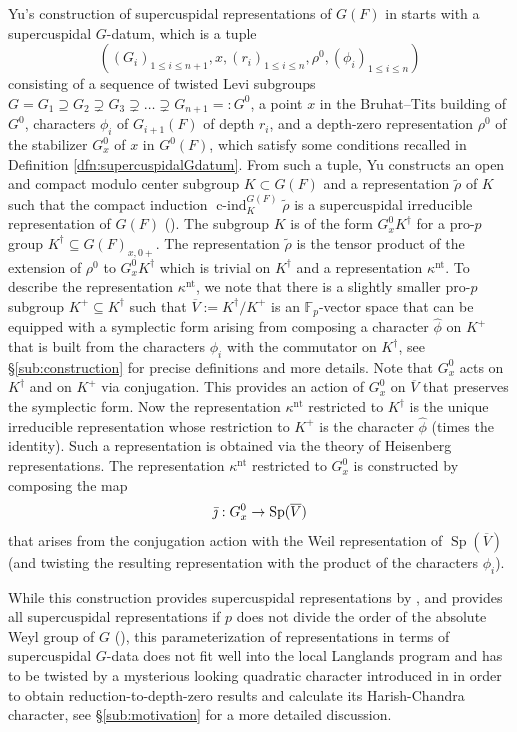 \documentclass{article}
\def\ol#1{\overline{#1}}
\def\hat{\widehat}
\newcommand{\bF}{\mathbb{F}}
\DeclareMathOperator{\Sp}{Sp}
\DeclareMathOperator{\cind}{c-ind}
\theoremstyle{definition}
\numberwithin{equation}{subsection}
\renewcommand{\-}{\hyp{}}
\begin{document}
Yu's construction of supercuspidal representations of $G(F)$ in \cite{Yu01} starts with a supercuspidal $G$-datum, which is a tuple
\[((G_i)_{1\leq i\leq n+1},x,(r_i)_{1\leq i\leq n},\rho^0,(\phi_i)_{1\leq i\leq n}) \]
consisting of a sequence of twisted Levi subgroups $G=G_1 \supseteq G_2 \supsetneq G_3 \supsetneq \hdots \supsetneq G_{n+1}=: G^0$, a point $x$ in the Bruhat--Tits building of $G^0$, characters $\phi_i$ of $G_{i+1}(F)$ of depth $r_i$, and a depth-zero representation $\rho^0$ of the stabilizer $G^0_x$ of $x$ in $G^0(F)$, which satisfy some conditions recalled in Definition \ref{dfn:supercuspidalGdatum}.
From such a tuple, Yu constructs an open and compact modulo center subgroup $K \subset G(F)$ and a representation $\tilde \rho$ of $K$ such that the compact induction $\cind_K^{G(F)} \tilde \rho$ is a supercuspidal irreducible representation of $G(F)$ (\cite{Yu01, Fin21Comp}).
The subgroup $K$ is of the form $G^0_xK^\dagger$ for a pro-$p$ group $K^\dagger \subseteq G(F)_{x,0+}$. The representation $\tilde \rho$ is the tensor product of the extension of $\rho^0$ to $G^0_xK^\dagger$ which is trivial on $K^\dagger$ and a representation $\kappa^{\mathrm{nt}}$. To describe the representation $\kappa^{\mathrm{nt}}$, we note that there is a slightly smaller pro-$p$ subgroup $K^+ \subseteq K^\dagger$ such that $\ol{V} := K^\dagger/K^+$ is an $\bF_p$-vector space that can be equipped with a symplectic form arising from composing a character $\hat \phi$ on $K^+$ that is built from the characters $\phi_i$ with the commutator on $K^\dagger$, see \S\ref{sub:construction} for precise definitions and more details. Note that $G^0_x$ acts on $K^\dagger$ and on $K^+$ via conjugation. This provides an action of $G^0_x$ on $\ol{V}$ that preserves the symplectic form. Now the representation $\kappa^{\mathrm{nt}}$ restricted to $K^\dagger$ is the unique irreducible representation whose restriction to $K^+$ is the character $\hat \phi$ (times the identity). Such a representation is obtained via the theory of Heisenberg representations. The representation  $\kappa^{\mathrm{nt}}$ restricted to $G^0_x$ is constructed by composing the map 
\begin{equation} \label{eqn:G0xtoSp} \bar\jmath :  G^0_x \ra \Sp(\ol{V}) \end{equation}
that arises from the conjugation action
with the Weil representation of $\Sp(\ol{V})$ (and twisting the resulting representation with the product of the characters $\phi_i$).

While this construction provides supercuspidal representations by \cite{Yu01, Fin21Comp}, and provides all supercuspidal representations if $p$ does not divide the order of the absolute Weyl group of $G$ (\cite{Kim07, Fin21}), this parameterization of representations in terms of supercuspidal $G$-data does not fit well into the local Langlands program and has to be twisted by a mysterious looking quadratic character introduced in \cite{FKS23} in order to obtain reduction-to-depth-zero results and calculate its Harish-Chandra character, see \S\ref{sub:motivation} for a more detailed discussion.
\end{document}
